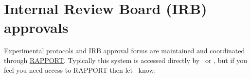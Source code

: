 \documentclass{tufte-book} %
\begin{document}






\chapter{Internal Review Board (IRB) approvals}
Experimental  protocols and IRB approval forms are maintained and
coordinated through
\href{https://rapport.dartmouth.edu/}{RAPPORT}.  Typically this system
is accessed directly by \director~or \coordinator, but if you feel you
need access to RAPPORT then let \director~know.

\end{document}
